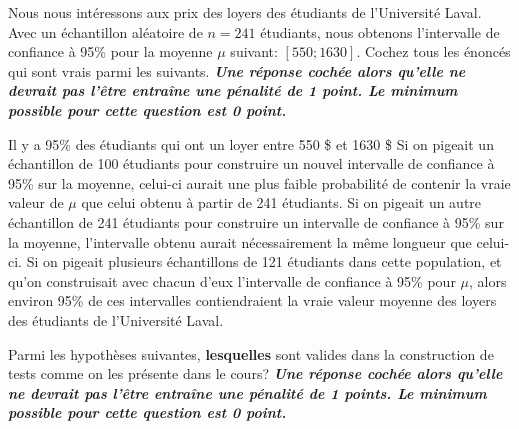 \begin{questions}

\vspace{0.5cm}
\question [4] Nous nous intéressons aux prix des loyers des étudiants de l'Université Laval. 
Avec un échantillon aléatoire de $n=241$ étudiants, nous obtenons l'intervalle de confiance à 95\%  pour la moyenne $\mu$ suivant: $[550;1630]$. 
Cochez tous les énoncés qui sont vrais parmi les suivants. \textit{\textbf{Une réponse cochée alors qu'elle ne devrait pas l'être entraîne une pénalité de 1 point. Le minimum possible pour cette question est 0 point.}}
 
\begin{checkboxes}
\choice Il y a 95\% des étudiants qui ont un loyer entre 550 \$ et 1630 \$
\choice Si on pigeait un échantillon de 100 étudiants pour construire un nouvel intervalle de confiance à 95\% sur la moyenne, celui-ci aurait une plus faible probabilité de contenir la vraie valeur de $\mu$ que celui obtenu à partir de 241 étudiants.
\choice Si on pigeait un autre échantillon de 241 étudiants pour construire un intervalle de confiance à 95\% sur la moyenne, l'intervalle obtenu aurait nécessairement la même longueur que celui-ci.
\correctchoice Si on pigeait plusieurs échantillons de 121 étudiants dans cette population, et qu'on construisait avec chacun d'eux l'intervalle de confiance à 95\% pour $\mu$, alors environ 95\% de ces intervalles contiendraient la vraie valeur moyenne des loyers des étudiants de l'Université Laval. 
\end{checkboxes}
\vspace{0.5cm}
\question[4]
Parmi les hypothèses suivantes, \textbf{lesquelles} sont valides dans la construction de tests comme on les présente dans le cours? \textit{\textbf{Une réponse cochée alors qu'elle ne devrait pas l'être entraîne une pénalité de 1 points. Le minimum possible pour cette question est 0 point.}}


\end{questions}
